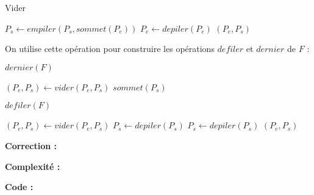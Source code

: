 \documentclass[../main.tex]{subfiles}
\begin{document}
\begin{algorithm}
\caption{Vider}\label{alg:vider_piles}
 {
	$P_s \leftarrow empiler(P_s, sommet(P_e))$\;
	$P_e \leftarrow depiler(P_e)$\;
}
\Return $(P_e, P_s)$\;
\end{algorithm}

On utilise cette opération pour construire les opérations $defiler$ et $dernier$ de $F$ :

\begin{algorithm}
\caption{$dernier(F)$}\label{alg:dernier}
 {
	$(P_e, P_s) \leftarrow vider(P_e, P_s)$ 
}
\Return $sommet(P_s)$
\end{algorithm}
\begin{algorithm}
\caption{$defiler(F)$}\label{alg:defiler}
 {
	$(P_e, P_s) \leftarrow vider(P_e, P_s)$ 
	$P_s \leftarrow depiler(P_s)$\;
} {
	$P_s \leftarrow depiler(P_s)$\;
}
\Return $(P_e, P_s)$
\end{algorithm}

\textbf{Correction :}

\textbf{Complexité :}


\textbf{Code :} 
\end{document}
